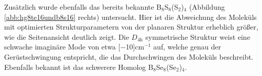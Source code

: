 Zusätzlich wurde ebenfalls das bereits bekannte B$_8$S$_8$(S$_2$)$_4$\supercite{krebs1980b8s16} (Abbildung \ref{abb:hg8te16undb8s16} rechts) untersucht. Hier ist die Abweichung des Moleküls mit optimierten Strukturparametern von der planaren Struktur erheblich größer, wie die Seitenansicht deutlich zeigt. Die $D_{4\textrm{h}}$ symmetrische Struktur weist eine schwache imaginäre Mode von etwa \unit[$-$10]{cm$^{-1}$} auf, welche genau der Gerüstschwingung entspricht, die das Durchschwingen des Moleküls beschreibt. Ebenfalls bekannt ist das schwerere Homolog B$_8$Se$_8$(Se$_2$)$_4$.

